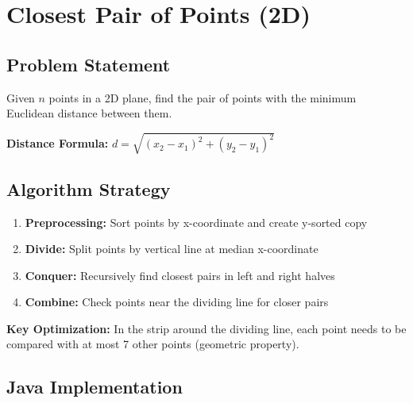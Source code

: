 \documentclass[12pt,a4paper]{article}
\begin{document}
\newpage

\section{Closest Pair of Points (2D)}

\subsection{Problem Statement}
\begin{tcolorbox}[colback=green!5!white,colframe=green!50!black,title=\textbf{Closest Pair Problem}]
Given $n$ points in a 2D plane, find the pair of points with the minimum Euclidean distance between them.

\textbf{Distance Formula:} $d = \sqrt{(x_2-x_1)^2 + (y_2-y_1)^2}$
\end{tcolorbox}

\subsection{Algorithm Strategy}

\begin{enumerate}
    \item \textbf{Preprocessing:} Sort points by x-coordinate and create y-sorted copy
    \item \textbf{Divide:} Split points by vertical line at median x-coordinate
    \item \textbf{Conquer:} Recursively find closest pairs in left and right halves
    \item \textbf{Combine:} Check points near the dividing line for closer pairs
\end{enumerate}

\textbf{Key Optimization:} In the strip around the dividing line, each point needs to be compared with at most 7 other points (geometric property).

\subsection{Java Implementation}
\end{document}
